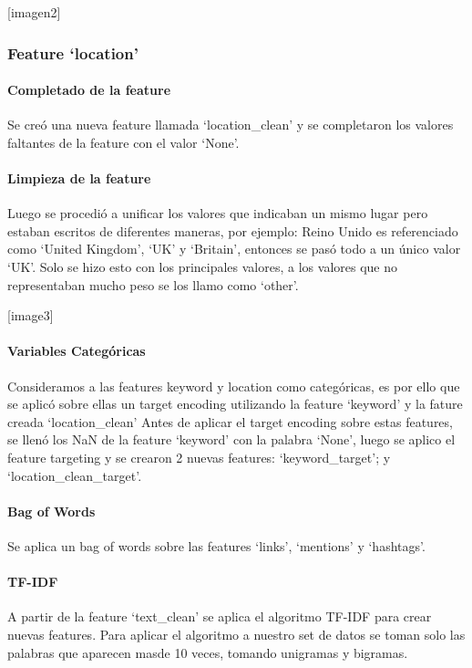 \documentclass[12pt]{article}
\begin{document}
[imagen2]


\subsubsection{Feature ‘location’}
\paragraph{Completado de la feature\\}
\newline Se creó una nueva feature llamada ‘location\_clean’ y se completaron los valores faltantes de la feature con el valor ‘None’.


\paragraph{Limpieza de la feature\\}
Luego se procedió a unificar los valores que indicaban un mismo lugar pero estaban escritos de diferentes maneras, por ejemplo: Reino Unido es referenciado como ‘United Kingdom’, ‘UK’ y ‘Britain’, entonces se pasó todo a un único valor ‘UK’.
Solo se hizo esto con los principales valores, a los valores que no representaban mucho peso se los llamo como ‘other’.

[image3]

\paragraph{Variables Categóricas\\}
Consideramos a las features keyword y location como categóricas, es por ello que se aplicó sobre ellas un target encoding utilizando la feature ‘keyword’ y la fature creada ‘location\_clean’
Antes de aplicar el target encoding sobre estas features, se llenó los NaN de la feature ‘keyword’ con la palabra ‘None’, luego se aplico el feature targeting y se crearon 2 nuevas features: ‘keyword\_target’; y ‘location\_clean\_target’.


\paragraph{Bag of Words\\}
Se aplica un bag of words sobre las features ‘links’, ‘mentions’ y ‘hashtags’.


\paragraph{TF-IDF\\}
A partir de la feature ‘text\_clean’ se aplica el algoritmo TF-IDF para crear nuevas features.
Para aplicar el algoritmo a nuestro set de datos se toman solo las palabras que aparecen masde 10 veces, tomando unigramas y bigramas.
\end{document}

